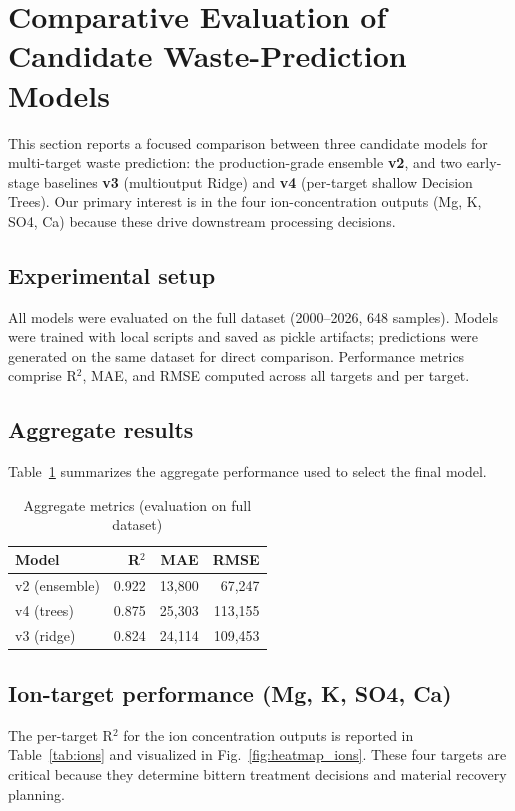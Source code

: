 \section{Comparative Evaluation of Candidate Waste-Prediction Models}
\label{sec:comparison}

This section reports a focused comparison between three candidate models for multi-target waste prediction: the production-grade ensemble \textbf{v2}, and two early-stage baselines \textbf{v3} (multioutput Ridge) and \textbf{v4} (per-target shallow Decision Trees). Our primary interest is in the four ion-concentration outputs (Mg, K, SO4, Ca) because these drive downstream processing decisions.

\subsection{Experimental setup}
All models were evaluated on the full dataset (2000--2026, 648 samples). Models were trained with local scripts and saved as pickle artifacts; predictions were generated on the same dataset for direct comparison. Performance metrics comprise R$^2$, MAE, and RMSE computed across all targets and per target.

\subsection{Aggregate results}
Table~\ref{tab:agg_short} summarizes the aggregate performance used to select the final model.

\begin{table}[ht]
\centering
\caption{Aggregate metrics (evaluation on full dataset)}
\label{tab:agg_short}
\begin{tabular}{lrrr}
\toprule
Model & R$^2$ & MAE & RMSE \\
\midrule
v2 (ensemble) & 0.922 & 13,800 & 67,247 \\
v4 (trees) & 0.875 & 25,303 & 113,155 \\
v3 (ridge) & 0.824 & 24,114 & 109,453 \\
\bottomrule
\end{tabular}
\end{table}

\subsection{Ion-target performance (Mg, K, SO4, Ca)}
The per-target R$^2$ for the ion concentration outputs is reported in Table~\ref{tab:ions} and visualized in Fig.~\ref{fig:heatmap_ions}. These four targets are critical because they determine bittern treatment decisions and material recovery planning.

